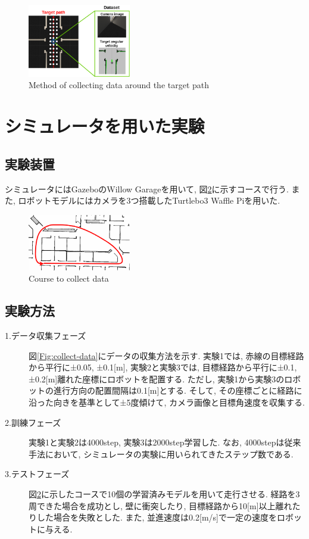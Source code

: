 \documentclass{ujarticle}
\begin{document}
\begin{figure}[h]
		\centering
		\includegraphics[width=0.4\textwidth]{img/proposed.png}
		\caption{Method of collecting data around the target path}
		\label{Fig:collect}
\end{figure}

\section{シミュレータを用いた実験}%
\subsection{実験装置}シミュレータにはGazebo\cite{gazebo}のWillow Garage\cite{willow}を用いて, 図\ref{Fig:willow}に示すコースで行う. また, ロボットモデルにはカメラを3つ搭載したTurtlebo3 Waffle Pi\cite{turtlebot3}を用いた. 

\begin{figure}[h]
		\centering
		\includegraphics[width=0.4\textwidth]{img/willow-path.png}
		\caption{Course to collect data}
		\label{Fig:willow}
\end{figure}

\subsection{実験方法}
\begin{description}
		\item[1.データ収集フェーズ]図\ref{Fig:collect-data}にデータの収集方法を示す. 実験1では, 赤線の目標経路から平行に±0.05, ±0.1[m], 実験2と実験3では, 目標経路から平行に±0.1, ±0.2[m]離れた座標にロボットを配置する. ただし, 実験1から実験3のロボットの進行方向の配置間隔は0.1[m]とする. そして, その座標ごとに経路に沿った向きを基準として±5度傾けて, カメラ画像と目標角速度を収集する. 
		\item[2.訓練フェーズ]実験1と実験2は4000step, 実験3は2000step学習した. なお, 4000stepは従来手法において, シミュレータの実験に用いられてきたステップ数である. 
		\item[3.テストフェーズ]図\ref{Fig:willow}に示したコースで10個の学習済みモデルを用いて走行させる. 経路を3周できた場合を成功とし, 壁に衝突したり, 目標経路から10[m]以上離れたりした場合を失敗とした. また, 並進速度は0.2[m/s]で一定の速度をロボットに与える. 
\end{description}
\end{document}
